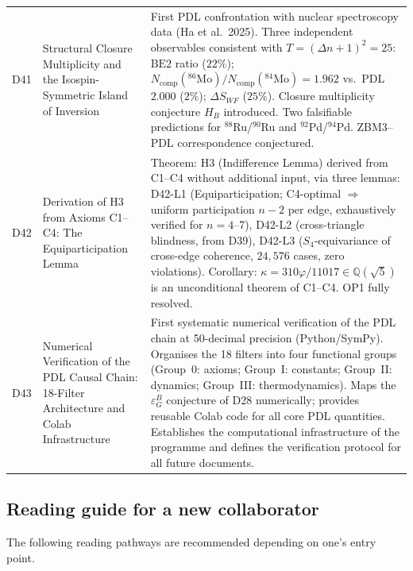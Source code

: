 \documentclass[11pt,a4paper]{article}
\theoremstyle{plain}
\theoremstyle{definition}
\theoremstyle{remark}
\newcommand{\epsGeomB}{\varepsilon_G^B}
\begin{document}
\begin{longtable}{L{1.3cm}L{3.8cm}L{8.0cm}}
D41 & Structural Closure Multiplicity and the Isospin-Symmetric Island of Inversion~\cite{D41} & First PDL confrontation with nuclear spectroscopy data (Ha et al.~2025). Three independent observables consistent with $T=({\Delta n}+1)^2=25$: $\mathrm{BE2}$ ratio ($22\%$); $N_{\mathrm{comp}}(^{86}\mathrm{Mo})/N_{\mathrm{comp}}(^{84}\mathrm{Mo})=1.962$ vs.\ PDL $2.000$ ($2\%$); $\Delta S_{WF}$ ($25\%$). Closure multiplicity conjecture $H_B$ introduced. Two falsifiable predictions for $^{88}$Ru/$^{90}$Ru and $^{92}$Pd/$^{94}$Pd. ZBM3--PDL correspondence conjectured.\\[0.4em]
D42 & Derivation of H3 from Axioms C1--C4: The Equiparticipation Lemma~\cite{D42} & \textcolor{proofblue}{Theorem}: H3 (Indifference Lemma) derived from C1--C4 without additional input, via three lemmas: D42-L1 (Equiparticipation; C4-optimal $\Rightarrow$ uniform participation $n-2$ per edge, exhaustively verified for $n=4$--7), D42-L2 (cross-triangle blindness, from D39), D42-L3 ($S_4$-equivariance of cross-edge coherence, $24{,}576$ cases, zero violations). Corollary: $\kappa=310\varphi/11017\in\mathbb{Q}(\sqrt{5})$ is an unconditional theorem of C1--C4. OP1 fully resolved.\\[0.4em]
D43 & Numerical Verification of the PDL Causal Chain: 18-Filter Architecture and Colab Infrastructure~\cite{D43} & First systematic numerical verification of the PDL chain at 50-decimal precision (Python/SymPy). Organises the 18 filters into four functional groups (Group~0: axioms; Group~I: constants; Group~II: dynamics; Group~III: thermodynamics). Maps the $\epsGeomB$ conjecture of D28 numerically; provides reusable Colab code for all core PDL quantities. Establishes the computational infrastructure of the programme and defines the verification protocol for all future documents.\\[0.4em]
\end{longtable}

\subsection{Reading guide for a new collaborator}
\label{subsec:readingguide}
The following reading pathways are recommended depending on one's entry point.
\end{document}
